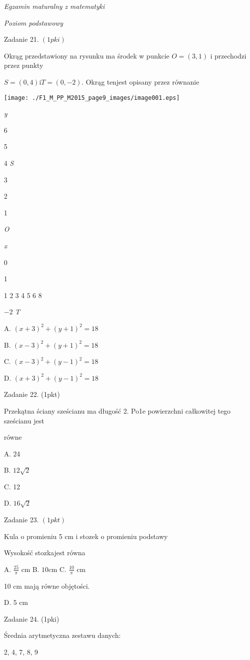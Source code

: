 \documentclass[a4paper,12pt]{article}
\begin{document}
{\it Egzamin maturalny z matematyki}

{\it Poziom podstawowy}

Zadanie 21. $(1pki)$

Okrąg przedstawiony na rysunku ma środek w punkcie $O=(3,1)$ i przechodzi przez punkty

$S=(0,4)\mathrm{i}T=(0,-2)$. Okrąg tenjest opisany przez równanie
\begin{center}
\texttt{[image: ./F1\_M\_PP\_M2015\_page9\_images/image001.eps]}
\end{center}
{\it y}

6

5

4 {\it S}

3

2

1

{\it O}

{\it x}

0

1

1 2  3 4 5 6  8

$-2$  {\it T}

A. $(x+3)^{2}+(y+1)^{2}=18$

B. $(x-3)^{2}+(y+1)^{2}=18$

C. $(x-3)^{2}+(y-1)^{2}=18$

D. $(x+3)^{2}+(y-1)^{2}=18$

Zadanie 22. (1pkt)

Przekątna ściany sześcianu ma długość 2. Po1e powierzchni całkowitej tego sześcianu jest

równe

A. 24

B. $12\sqrt{2}$

C. 12

D. $16\sqrt{2}$

Zadanie 23. $(1pkt)$

Kula o promieniu 5 cm i stozek o promieniu podstawy

Wysokość stozkajest równa

A. $\displaystyle \frac{25}{\pi}$ cm B. $10\mathrm{c}\mathrm{m}$ C. $\displaystyle \frac{10}{\pi}$ cm

10 cm mają równe objętości.

D. 5 cm

Zadanie 24. (1pki)

Średnia arytmetyczna zestawu danych:

2, 4, 7, 8, 9
\end{document}
